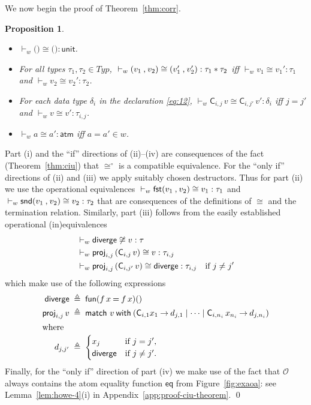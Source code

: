 \documentclass{LMCS}
\theoremstyle{plain}
\newtheorem{proposition}[thm]{Proposition}
\theoremstyle{definition}
\newcommand{\ALT}{\mathrel{\kw{|}}}
\newcommand{\atm}[1][a]{#1}
\newcommand{\ATM}{\kw{atm}}
\newcommand{\CON}[1][C]{\kw{#1}}
\newcommand{\defeq}{\triangleq}
\newcommand{\dty}{\delta}
\newcommand{\ent}{\vdash}
\newcommand{\EQ}{\mathbin{\kw{=}}}
\renewcommand{\exp}[1][e]{#1}
\newcommand{\FST}{\kw{fst}}
\newcommand{\FUN}{\kw{fun}}
\newcommand{\LP}{\mathopen{\kw{(}}}
\newcommand{\kw}[1]{\mathsf{#1}}
\newcommand{\MATCH}{\kw{match}}
\newcommand{\Obs}{\mathcal{O}}
\newcommand{\OBS}[1][obs]{\kw{#1}}
\newcommand{\ofty}{:}
\newcommand{\opeq}{\cong}
\newcommand{\opeqo}{\cong^{\circ}}
\newcommand{\PRODTY}{\mathbin{\kw{*}}}
\newcommand{\PROJ}{\kw{proj}}
\newcommand{\RP}{\mathclose{\kw{)}}}
\newcommand{\TO}{\mathbin{\rightarrow}}
\newcommand{\ty}{\tau}
\newcommand{\Ty}{\mathit{Typ}}
\newcommand{\UNIT}{\kw{unit}}
\newcommand{\UNITVAL}{\LP\RP}
\newcommand{\val}[1][v]{#1}
\newcommand{\vid}[1][x]{#1}
\newcommand{\w}[1][w]{#1}
\newcommand{\WITH}{\mathbin{\kw{with}}}
\begin{document}
We now begin the proof of Theorem~\ref{thm:corr}.

\begin{proposition}
  \label{prop:ext}\hfill
  \begin{itemize}
    
  \item[(i)] ${}\ent_{\w}\UNITVAL\opeq\UNITVAL\ofty\UNIT$.
    
  \item[(ii)] For all types $\ty_1,\ty_2\in\Ty$, ${}\ent_{\w}
    \PAIR{\val_1}{\val_2}\opeq\PAIR{\val_1'}{\val_2'}
    \ofty\ty_1\PRODTY\ty_2$ iff ${}\ent_{\w} \val_1\opeq
    \val_1'\ofty\ty_1$ and ${}\ent_{\w} \val_2\opeq
    \val_2'\ofty\ty_2$.

  \item[(iii)] For each data type $\dty_i$ in the declaration
    \eqref{eq:12}, ${}\ent_{\w} \CON_{i,j}\,\val
    \opeq\CON_{i,j'}\,v'\ofty\dty_i$ iff $j=j'$ and ${}\ent_{\w}
    \val\opeq \val'\ofty \ty_{i,j}$.

  \item[(iv)] ${}\ent_{\w} \atm\opeq \atm'\ofty\ATM$ iff
    $\atm=\atm'\in\w$.

  \end{itemize}
\end{proposition}
\proof
  Part (i) and the ``if'' directions of (ii)--(iv) are consequences of
  the fact (Theorem~\ref{thm:ciu}) that $\opeqo$ is a compatible
  equivalence.  For the ``only if'' directions of (ii) and (iii) we
  apply suitably chosen destructors. Thus for part (ii) we use the
  operational equivalences ${}\ent_{\w}\FST\PAIR{\val_1}{\val_2} \opeq
  \val_1\ofty\ty_1$ and ${}\ent_{\w}\SND\PAIR{\val_1}{\val_2} \opeq
  \val_2\ofty\ty_2$ that are consequences of the definitions of
  $\opeq$ and the termination relation. Similarly, part (iii) follows
  from the easily established operational (in)equivalences
  \begin{align*}
    {} &\ent_{\w} \DIVERGE \not\opeq \val \ofty \ty\\
    {} &\ent_{\w} \PROJ_{i,j}\,(\CON_{i,j}\,v) \opeq v \ofty \ty_{i,j}\\
    {} &\ent_{\w} \PROJ_{i,j}\,(\CON_{i,j'}\,v) \opeq \DIVERGE \ofty
    \ty_{i,j} \quad \text{if $j\not= j'$}
  \end{align*}
  which make use of the following expressions
  \begin{align*}
    \DIVERGE &\;\defeq\; \FUN(f\,x\EQ f\,x)\UNITVAL\\
    \PROJ_{i,j}\,\val &\;\defeq\; \MATCH\ \val \WITH (\CON_{i,1}\vid_1 \TO
    \exp[d]_{j,1} \ALT \cdots \ALT \CON_{i,n_i}\,\vid_{n_i} \TO
    \exp[d]_{j,n_i})\\
    \intertext{where}
    \exp[d]_{j,j'} &\;\defeq\;
    \begin{cases}
      \vid_j &\text{if $j=j'$,}\\
      \DIVERGE &\text{if $j\not= j'$.}
    \end{cases}
  \end{align*}
  Finally, for the ``only if'' direction of part (iv) we make use of
  the fact that $\Obs$ always contains the atom equality function
  $\OBS[eq]$ from Figure~\ref{fig:exaoa}: see
  Lemma~\ref{lem:howe-4}(i) in Appendix~\ref{app:proof-ciu-theorem}.
\qed
\end{document}
